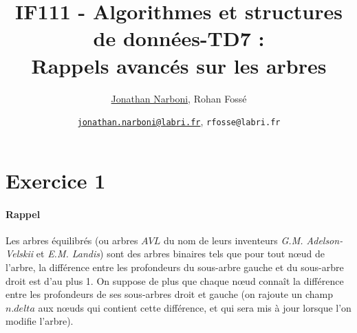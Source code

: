 \documentclass[10pt,a4paper]{article}
\title{IF111 - Algorithmes et structures de données-TD7 :\\ Rappels avancés sur les arbres}
\date{}
\author{\underline{Jonathan Narboni}, Rohan Fossé}
\date{\underline{\texttt{jonathan.narboni@labri.fr}}, \texttt{rfosse@labri.fr}}
\begin{document}
\maketitle

\section*{Exercice 1}

\paragraph*{Rappel}
Les arbres équilibrés (ou arbres $AVL$ du nom de leurs inventeurs \textit{G.M. Adelson-Velskii} et \textit{E.M. Landis}) sont des arbres binaires tels que pour tout nœud de l’arbre, la différence entre les profondeurs du sous-arbre gauche et du sous-arbre droit est d’au plus 1.
On suppose de plus que chaque nœud connaît la différence entre les profondeurs de ses sous-arbres droit et gauche (on rajoute un champ $n.delta$ aux nœuds qui contient cette différence, et qui sera mis à jour lorsque l’on modifie l’arbre).
\end{document}
